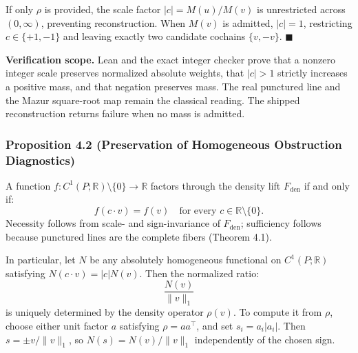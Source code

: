\documentclass[
  10pt,
]{article}
\begin{document}
If only \protect\hypertarget{math-E0069-0110}{}{\(\rho\)} is provided, the scale factor \protect\hypertarget{math-E0092-0111}{}{\(|c| = M(u) / M(v)\)} is unrestricted across \protect\hypertarget{math-E0093-0112}{}{\((0, \infty)\)}, preventing reconstruction. When \protect\hypertarget{math-E0067-0113}{}{\(M(v)\)} is admitted, \protect\hypertarget{math-E0094-0114}{}{\(|c| = 1\)}, restricting \protect\hypertarget{math-E0095-0115}{}{\(c \in \{+1, -1\}\)} and leaving exactly two candidate cochains \protect\hypertarget{math-E0068-0116}{}{\(\{v, -v\}\)}. \protect\hypertarget{math-E0030-0117}{}{\(\blacksquare\)}

\textbf{Verification scope.} Lean and the exact integer checker prove that a nonzero integer scale preserves normalized absolute weights, that \protect\hypertarget{math-E0096-0118}{}{\(|c| > 1\)} strictly increases a positive mass, and that negation preserves mass. The real punctured line and the Mazur square-root map remain the classical reading. The shipped reconstruction returns failure when no mass is admitted.

\subsubsection{Proposition 4.2 (Preservation of Homogeneous Obstruction Diagnostics)}\label{proposition-4.2-preservation-of-homogeneous-obstruction-diagnostics}

A function \protect\hypertarget{math-E0097-0119}{}{\(f: C^1(P; \mathbb{R}) \setminus \{0\} \to \mathbb{R}\)} factors through the density lift \protect\hypertarget{math-E0003-0120}{}{\(F_{\mathrm{den}}\)} if and only if: \protect\hypertarget{math-E0098-0121}{}{\[f(c \cdot v) = f(v) \quad \text{for every } c \in \mathbb{R} \setminus \{0\}.\]} Necessity follows from scale- and sign-invariance of \protect\hypertarget{math-E0003-0122}{}{\(F_{\mathrm{den}}\)}; sufficiency follows because punctured lines are the complete fibers (Theorem 4.1).

In particular, let \protect\hypertarget{math-E0099-0123}{}{\(N\)} be any absolutely homogeneous functional on \protect\hypertarget{math-E0040-0124}{}{\(C^1(P; \mathbb{R})\)} satisfying \protect\hypertarget{math-E0100-0125}{}{\(N(c \cdot v) = |c| N(v)\)}. Then the normalized ratio: \protect\hypertarget{math-E0101-0126}{}{\[\boxed{\frac{N(v)}{\|v\|_1}}\]} is uniquely determined by the density operator \protect\hypertarget{math-E0102-0127}{}{\(\rho(v)\)}. To compute it from \protect\hypertarget{math-E0069-0128}{}{\(\rho\)}, choose either unit factor \protect\hypertarget{math-E0103-0129}{}{\(a\)} satisfying \protect\hypertarget{math-E0104-0130}{}{\(\rho = a a^\top\)}, and set \protect\hypertarget{math-E0105-0131}{}{\(s_i = a_i |a_i|\)}. Then \protect\hypertarget{math-E0106-0132}{}{\(s = \pm v / \|v\|_1\)}, so \protect\hypertarget{math-E0107-0133}{}{\(N(s) = N(v) / \|v\|_1\)} independently of the chosen sign.
\end{document}

